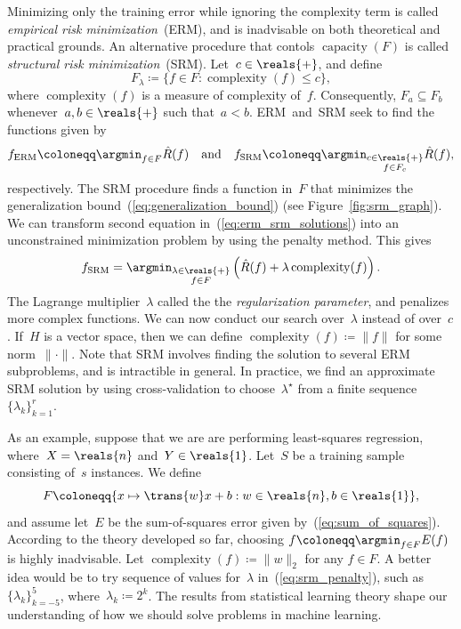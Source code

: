 \documentclass[11pt,a4paper]{article}
\numberwithin{equation}{section}
\newcommand{\capacity}{\operatorname{capacity}}
\newcommand{\complexity}{\operatorname{complexity}}
\begin{document}
Minimizing only the training error while ignoring the complexity term is called
\emph{empirical risk minimization}~(ERM), and is inadvisable on both theoretical
and practical grounds. An alternative procedure that contols $\capacity(F)$ is
called \emph{structural risk minimization}~(SRM). Let~$c \in \reals{+}$, and
define
\begin{equation}
	F_\lambda \coloneqq \{ f \in F : \complexity(f) \leq c \},
	\label{eq:regularized_family}
\end{equation}
where $\complexity(f)$ is a measure of complexity of~$f$. Consequently, $F_a
\subseteq F_b$ whenever~$a, b \in \reals{+}$ such that~$a < b$. ERM~and~SRM seek
to find the functions given by
\begin{equation}
	f_{\text{ERM}} \coloneqq \argmin_{f \in F} \hat{R}(f)
	\quad\text{and}\quad
	f_{\text{SRM}} \coloneqq \argmin_{\substack{c \in \reals{+} \\ f \in F_c}}
		\hat{R}(f),
	\label{eq:erm_srm_solutions}
\end{equation}
respectively. The SRM procedure finds a function in~$F$ that minimizes the
generalization bound~(\ref{eq:generalization_bound}) (see
Figure~\ref{fig:srm_graph}). We can transform second equation
in~(\ref{eq:erm_srm_solutions}) into an unconstrained minimization problem by
using the penalty method. This gives
\begin{equation}
	f_{\text{SRM}} = \argmin_{\substack{\lambda \in \reals{+} \\ f \in F}}
		\left(\hat{R}(f) + \lambda\complexity(f)\right).
	\label{eq:srm_penalty}
\end{equation}
The Lagrange multiplier~$\lambda$ called the the \emph{regularization
parameter}, and penalizes more complex functions. We can now conduct our search
over~$\lambda$ instead of over~$c$. If~$H$ is a vector space, then we can define
$\complexity(f) \coloneqq \|f\|$ for some norm~${\|\cdot\|}$. Note that SRM
involves finding the solution to several ERM subproblems, and is intractible in
general. In practice, we find an approximate SRM solution by using
cross-validation to choose~$\lambda^\star$ from a finite sequence~$\{ \lambda_k
\}_{k = 1}^r$.

As an example, suppose that we are are performing least-squares regression,
where~$X = \reals{n}$ and~$Y \in \reals{1}$. Let~$S$ be a training sample
consisting of~$s$ instances. We define
\[
	F \coloneqq \{ x \mapsto \trans{w}x + b : w \in \reals{n}, b \in
		\reals{1} \},
	\label{eq:affine_family}
\]
and assume let~$E$ be the sum-of-squares error given
by~(\ref{eq:sum_of_squares}). According to the theory developed so far, choosing
$f \coloneqq \argmin_{f \in F} E(f)$ is highly inadvisable. Let $\complexity(f)
\coloneqq \|w\|_2$ for any $f \in F$. A better idea would be to try sequence of
values for~$\lambda$ in~(\ref{eq:srm_penalty}), such as~$\{ \lambda_k \}_{k =
-5}^5$, where~$\lambda_k \coloneqq 2^k$. The results from statistical learning
theory shape our understanding of how we should solve problems in machine
learning.
\end{document}
